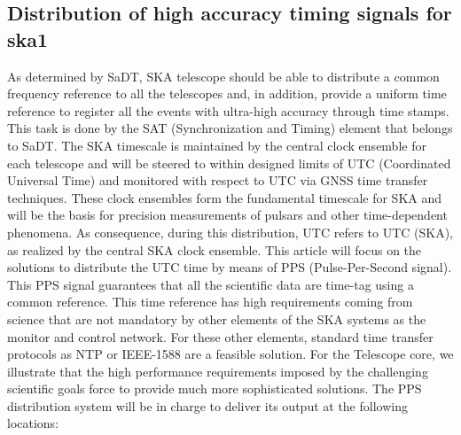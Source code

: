 


\subsection{Distribution of high accuracy timing signals for ska1}

As determined by SaDT, SKA telescope should be able to distribute a common frequency reference to all the telescopes and, in addition, provide a uniform time reference to register all the events with ultra-high accuracy through time stamps. This task is done by the SAT (Synchronization and Timing) element that belongs to SaDT. The SKA timescale is maintained by the central clock ensemble for each telescope and will be steered to within designed limits of UTC (Coordinated Universal Time) and monitored with respect to UTC via GNSS time transfer techniques. These clock ensembles form the fundamental timescale for SKA and will be the basis for precision measurements of pulsars and other time-dependent phenomena. As consequence, during this distribution, UTC refers to UTC (SKA), as realized by the central SKA clock ensemble.
This article will focus on the solutions to distribute the UTC time by means of PPS (Pulse-Per-Second signal). This PPS signal guarantees that all the scientific data are time-tag using a common reference. This time reference has high requirements coming from science that are not mandatory by other elements of the SKA systems as the monitor and control network. For these other elements, standard time transfer protocols as NTP or IEEE-1588 are a feasible solution. For the Telescope core, we illustrate that the high performance requirements imposed by the challenging scientific goals force to provide much more sophisticated solutions. 
The PPS distribution system will be in charge to deliver its output at the following locations:

